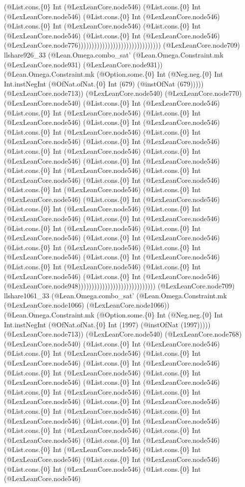 \documentclass[11pt]{article}
\begin{document}
(@List.cons.\{0\} Int (@LexLeanCore.node546) (@List.cons.\{0\} Int (@LexLeanCore.node546) (@List.cons.\{0\} Int (@LexLeanCore.node546) (@List.cons.\{0\} Int (@LexLeanCore.node546) (@List.cons.\{0\} Int (@LexLeanCore.node546) (@List.cons.\{0\} Int (@LexLeanCore.node546) (@LexLeanCore.node776))))))))))))))))))))))))))))))) (@LexLeanCore.node709) llshare926\_33 (@Lean.Omega.combo\_sat' (@Lean.Omega.Constraint.mk (@LexLeanCore.node931) (@LexLeanCore.node931)) (@Lean.Omega.Constraint.mk (@Option.some.\{0\} Int (@Neg.neg.\{0\} Int Int.instNegInt (@OfNat.ofNat.\{0\} Int (679) (@instOfNat (679))))) (@LexLeanCore.node713)) (@LexLeanCore.node540) (@LexLeanCore.node770) (@LexLeanCore.node540) (@List.cons.\{0\} Int (@LexLeanCore.node546) (@List.cons.\{0\} Int (@LexLeanCore.node546) (@List.cons.\{0\} Int (@LexLeanCore.node546) (@List.cons.\{0\} Int (@LexLeanCore.node546) (@List.cons.\{0\} Int (@LexLeanCore.node546) (@List.cons.\{0\} Int (@LexLeanCore.node546) (@List.cons.\{0\} Int (@LexLeanCore.node546) (@List.cons.\{0\} Int (@LexLeanCore.node546) (@List.cons.\{0\} Int (@LexLeanCore.node546) (@List.cons.\{0\} Int (@LexLeanCore.node546) (@List.cons.\{0\} Int (@LexLeanCore.node546) (@List.cons.\{0\} Int (@LexLeanCore.node546) (@List.cons.\{0\} Int (@LexLeanCore.node546) (@List.cons.\{0\} Int (@LexLeanCore.node546) (@List.cons.\{0\} Int (@LexLeanCore.node546) (@List.cons.\{0\} Int (@LexLeanCore.node546) (@List.cons.\{0\} Int (@LexLeanCore.node546) (@List.cons.\{0\} Int (@LexLeanCore.node546) (@List.cons.\{0\} Int (@LexLeanCore.node546) (@List.cons.\{0\} Int (@LexLeanCore.node546) (@List.cons.\{0\} Int (@LexLeanCore.node546) (@List.cons.\{0\} Int (@LexLeanCore.node546) (@List.cons.\{0\} Int (@LexLeanCore.node546) (@List.cons.\{0\} Int (@LexLeanCore.node546) (@List.cons.\{0\} Int (@LexLeanCore.node546) (@List.cons.\{0\} Int (@LexLeanCore.node546) (@List.cons.\{0\} Int (@LexLeanCore.node546) (@List.cons.\{0\} Int (@LexLeanCore.node546) (@LexLeanCore.node948))))))))))))))))))))))))))))) (@LexLeanCore.node709) llshare1061\_33 (@Lean.Omega.combo\_sat' (@Lean.Omega.Constraint.mk (@LexLeanCore.node1066) (@LexLeanCore.node1066)) (@Lean.Omega.Constraint.mk (@Option.some.\{0\} Int (@Neg.neg.\{0\} Int Int.instNegInt (@OfNat.ofNat.\{0\} Int (1997) (@instOfNat (1997))))) (@LexLeanCore.node713)) (@LexLeanCore.node540) (@LexLeanCore.node768) (@LexLeanCore.node540) (@List.cons.\{0\} Int (@LexLeanCore.node546) (@List.cons.\{0\} Int (@LexLeanCore.node546) (@List.cons.\{0\} Int (@LexLeanCore.node546) (@List.cons.\{0\} Int (@LexLeanCore.node546) (@List.cons.\{0\} Int (@LexLeanCore.node546) (@List.cons.\{0\} Int (@LexLeanCore.node546) (@List.cons.\{0\} Int (@LexLeanCore.node546) (@List.cons.\{0\} Int (@LexLeanCore.node546) (@List.cons.\{0\} Int (@LexLeanCore.node546) (@List.cons.\{0\} Int (@LexLeanCore.node546) (@List.cons.\{0\} Int (@LexLeanCore.node546) (@List.cons.\{0\} Int (@LexLeanCore.node546) (@List.cons.\{0\} Int (@LexLeanCore.node546) (@List.cons.\{0\} Int (@LexLeanCore.node546) (@List.cons.\{0\} Int (@LexLeanCore.node546) (@List.cons.\{0\} Int (@LexLeanCore.node546) (@List.cons.\{0\} Int (@LexLeanCore.node546) (@List.cons.\{0\} Int (@LexLeanCore.node546) (@List.cons.\{0\} Int (@LexLeanCore.node546) (@List.cons.\{0\} Int (@LexLeanCore.node546) (@List.cons.\{0\} Int (@LexLeanCore.node546) 
\end{document}
